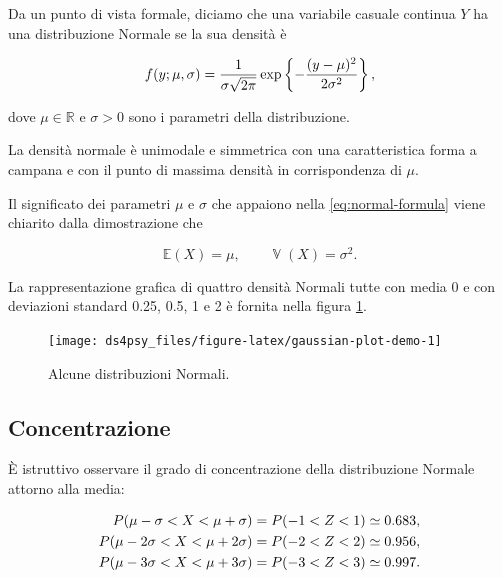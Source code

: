 \documentclass[
  11pt,
]{krantz}
\newcommand{\E}{\mathbb{E}} %
\DeclareMathOperator{\Var}{\mathbb{V}} %
\theoremstyle{definition}
\theoremstyle{definition}
\theoremstyle{definition}
\theoremstyle{definition}
\theoremstyle{remark}
\begin{document}
Da un punto di vista formale, diciamo che una variabile casuale continua \(Y\) ha una distribuzione Normale se la sua densità è

\begin{equation}
f(y; \mu, \sigma) = {1 \over {\sigma\sqrt{2\pi} }} \exp \left\{-\frac{(y -  \mu)^2}{2 \sigma^2} \right\},
\label{eq:normal-formula}
\end{equation}

dove \(\mu \in \mathbb{R}\) e \(\sigma > 0\) sono i parametri della distribuzione.

La densità normale è unimodale e simmetrica con una caratteristica forma a campana e con il punto di massima densità in corrispondenza di \(\mu\).

Il significato dei parametri \(\mu\) e \(\sigma\) che appaiono nella \eqref{eq:normal-formula} viene chiarito dalla dimostrazione che

\begin{equation}
\E(X) = \mu, \qquad \Var(X) = \sigma^2.
\end{equation}

La rappresentazione grafica di quattro densità Normali tutte con media 0 e con deviazioni standard 0.25, 0.5, 1 e 2 è fornita nella figura \ref{fig:gaussian-plot-demo}.

\begin{figure}[h]

{\centering \texttt{[image: ds4psy\_files/figure-latex/gaussian-plot-demo-1]} 

}

\caption{Alcune distribuzioni Normali.}\label{fig:gaussian-plot-demo}
\end{figure}

\hypertarget{concentrazione}{%
\subsection{Concentrazione}\label{concentrazione}}

È istruttivo osservare il grado di concentrazione della distribuzione Normale attorno alla media:

\begin{align}
P(\mu - \sigma < X < \mu + \sigma) &= P (-1 < Z < 1) \simeq 0.683, \notag\\
P(\mu - 2\sigma < X < \mu + 2\sigma) &= P (-2 < Z < 2) \simeq 0.956, \notag\\
P(\mu - 3\sigma < X < \mu + 3\sigma) &= P (-3 < Z < 3) \simeq 0.997. \notag
\end{align}
\end{document}
